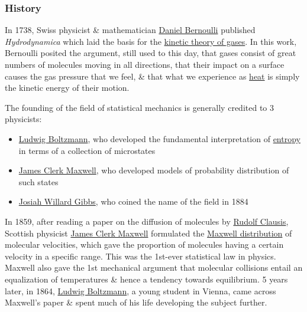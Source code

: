 \documentclass{article}
\begin{document}
\subsubsection{History}
In 1738, Swiss physicist \& mathematician \href{https://en.wikipedia.org/wiki/Daniel_Bernoulli}{\sc Daniel Bernoulli} published {\it Hydrodynamica} which laid the basis for the \href{https://en.wikipedia.org/wiki/Kinetic_theory_of_gases}{kinetic theory of gases}. In this work, {\sc Bernoulli} posited the argument, still used to this day, that gases consist of great numbers of molecules moving in all directions, that their impact on a surface causes the gas pressure that we feel, \& that what we experience as \href{https://en.wikipedia.org/wiki/Heat}{heat} is simply the kinetic energy of their motion.

The founding of the field of statistical mechanics is generally credited to 3 physicists:
\begin{itemize}
	\item \href{https://en.wikipedia.org/wiki/Ludwig_Boltzmann}{\sc Ludwig Boltzmann}, who developed the fundamental interpretation of \href{https://en.wikipedia.org/wiki/Entropy}{entropy} in terms of a collection of microstates
	\item \href{https://en.wikipedia.org/wiki/James_Clerk_Maxwell}{\sc James Clerk Maxwell}, who developed models of probability distribution of such states
	\item \href{https://en.wikipedia.org/wiki/Josiah_Willard_Gibbs}{\sc Josiah Willard Gibbs}, who coined the name of the field in 1884
\end{itemize}
In 1859, after reading a paper on the diffusion of molecules by \href{https://en.wikipedia.org/wiki/Rudolf_Clausius}{\sc Rudolf Clausis}, Scottish physicist \href{https://en.wikipedia.org/wiki/James_Clerk_Maxwell}{\sc James Clerk Maxwell} formulated the \href{https://en.wikipedia.org/wiki/Maxwell_distribution}{Maxwell distribution} of molecular velocities, which gave the proportion of molecules having a certain velocity in a specific range. This was the 1st-ever statistical law in physics. {\sc Maxwell} also gave the 1st mechanical argument that molecular collisions entail an equalization of temperatures \& hence a tendency towards equilibrium. 5 years later, in 1864, \href{https://en.wikipedia.org/wiki/Ludwig_Boltzmann}{\sc Ludwig Boltzmann}, a young student in Vienna, came across {\sc Maxwell}'s paper \& spent much of his life developing the subject further.
\end{document}
